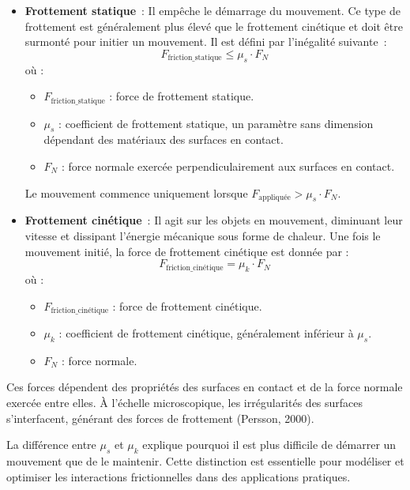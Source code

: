 \begin{itemize}
    \item \textbf{Frottement statique} : Il empêche le démarrage du mouvement. Ce type de frottement est généralement plus élevé que le frottement cinétique et doit être surmonté pour initier un mouvement. Il est défini par l'inégalité suivante :
    \[
    F_{\text{friction\_statique}} \leq \mu_s \cdot F_N
    \]
    où :
    \begin{itemize}
        \item \( F_{\text{friction\_statique}} \) : force de frottement statique.
        \item \( \mu_s \) : coefficient de frottement statique, un paramètre sans dimension dépendant des matériaux des surfaces en contact.
        \item \( F_N \) : force normale exercée perpendiculairement aux surfaces en contact.
    \end{itemize}

    Le mouvement commence uniquement lorsque \( F_{\text{appliquée}} > \mu_s \cdot F_N \).
    
    \item \textbf{Frottement cinétique} : Il agit sur les objets en mouvement, diminuant leur vitesse et dissipant l’énergie mécanique sous forme de chaleur. Une fois le mouvement initié, la force de frottement cinétique est donnée par :
    \[
    F_{\text{friction\_cinétique}} = \mu_k \cdot F_N
    \]
    où :
    \begin{itemize}
        \item \( F_{\text{friction\_cinétique}} \) : force de frottement cinétique.
        \item \( \mu_k \) : coefficient de frottement cinétique, généralement inférieur à \( \mu_s \).
        \item \( F_N \) : force normale.
    \end{itemize}
\end{itemize}

Ces forces dépendent des propriétés des surfaces en contact et de la force normale exercée entre elles. À l’échelle microscopique, les irrégularités des surfaces s’interfacent, générant des forces de frottement (Persson, 2000).

La différence entre \( \mu_s \) et \( \mu_k \) explique pourquoi il est plus difficile de démarrer un mouvement que de le maintenir. Cette distinction est essentielle pour modéliser et optimiser les interactions frictionnelles dans des applications pratiques.

